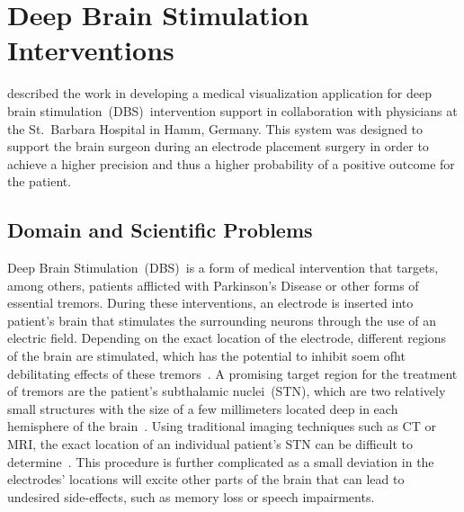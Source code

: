 
\section{Deep Brain Stimulation Interventions} \label{contributions:dbs}
 described the work in developing a medical visualization application for deep brain stimulation~(DBS)~intervention support in collaboration with physicians at the St.~Barbara Hospital in Hamm, Germany.  This system was designed to support the brain surgeon during an electrode placement surgery in order to achieve a higher precision and thus a higher probability of a positive outcome for the patient.



\subsection{Domain and Scientific Problems} \label{contributions:dbs:background}
Deep Brain Stimulation~(DBS)~is a form of medical intervention that targets, among others, patients afflicted with Parkinson's Disease or other forms of essential tremors.  During these interventions, an electrode is inserted into patient's brain that stimulates the surrounding neurons through the use of an electric field.  Depending on the exact location of the electrode, different regions of the brain are stimulated, which has the potential to inhibit soem ofht debilitating effects of these tremors~\cite{lindberg2002impact}.  A promising target region for the treatment of tremors are the patient's subthalamic nuclei~(STN), which are two relatively small structures with the size of a few millimeters located deep in each hemisphere of the brain~\cite{benabid2009deep, richter2004determining}.  Using traditional imaging techniques such as CT or MRI, the exact location of an individual patient's STN can be difficult to determine~\cite{starr2002implantation}.  This procedure is further complicated as a small deviation in the electrodes' locations will excite other parts of the brain that can lead to undesired side-effects, such as memory loss or speech impairments.

